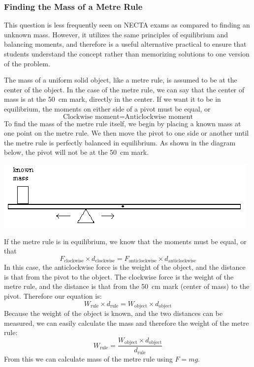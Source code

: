 \subsubsection{Finding the Mass of a Metre Rule}

This question is less frequently seen on NECTA exams as compared to finding an unknown mass. However, it utilizes the same principles of equilibrium and balancing moments, and therefore is a useful alternative practical to ensure that students understand the concept rather than memorizing solutions to one version of the problem.

The mass of a uniform solid object, like a metre rule, is assumed to be at the
center of the object. In the case of the metre rule, we can say that the center of mass is at
the 50~cm mark, directly in the center. If we want it to be in equilibrium, the moments on
either side of a pivot must be equal, or $$ \mathrm{\text{Clockwise moment}} = \mathrm{\text{Anticlockwise moment}}$$
To find the mass of the metre rule itself, we begin by placing a known mass at one
point on the metre rule. We then move the pivot to one side or another until the metre
rule is perfectly balanced in equilibrium. As shown in the diagram below, the pivot will
not be at the 50~cm mark.

\begin{center}
\includegraphics{./img/meter-rule.png}
\end{center}

If the metre rule is in equilibrium, we know that the moments must be equal, or
that $$F_{\mathrm{clockwise}} \times d_{\mathrm{clockwise}} = F_{\mathrm{anticlockwise}} \times d_{\mathrm{anticlockwise}}$$
In this case, the anticlockwise force is the weight of the object, and the distance is that
from the pivot to the object. The clockwise force is the weight of the metre rule, and the
distance is that from the 50~cm mark (center of mass) to the pivot. Therefore our
equation is: $$ W_{\mathrm{rule}} \times d_{\mathrm{rule}} = W_{\mathrm{object}} \times d_{\mathrm{object}} $$
Because the weight of the object is known, and the two distances can be measured, we
can easily calculate the mass and therefore the weight of the metre rule:
$$W_{\mathrm{rule}} = \frac{W_{\mathrm{object}} \times d_{\mathrm{object}}}{d_{\mathrm{rule}}}$$
From this we can calculate mass of the metre rule using $F = mg$.

